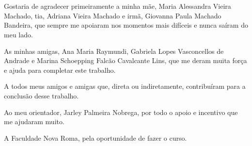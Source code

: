 \section*{} 
Gostaria de agradecer primeiramente a minha mãe, Maria Alessandra Vieira Machado, tia, Adriana Vieira Machado e irmã, Giovanna Paula Machado Bandeira, que sempre me apoiaram nos momentos mais difíceis e nunca saíram do meu lado.

As minhas amigas, Ana Maria Raymundi, Gabriela Lopes Vasconcellos de Andrade e Marina Schoepping Falcão Cavalcante Lins, que me deram muita força e ajuda para completar este trabalho.

A todos meus amigos e amigas que, direta ou indiretamente, contribuíram para a conclusão desse trabalho.

Ao meu orientador, Jarley Palmeira Nobrega, por todo o apoio e incentivo que me ajudaram muito.

A Faculdade Nova Roma, pela oportunidade de fazer o curso.

